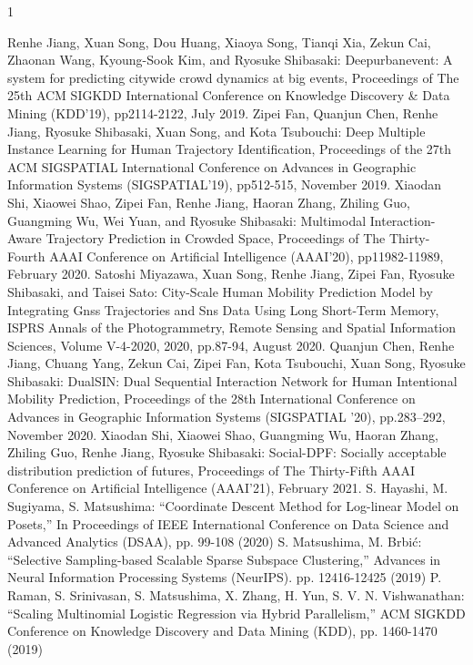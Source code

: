 \begin{査読付}{1}

Renhe Jiang, Xuan Song, Dou Huang, Xiaoya Song, Tianqi Xia, Zekun Cai, Zhaonan Wang, Kyoung-Sook Kim, and Ryosuke Shibasaki:
Deepurbanevent: A system for predicting citywide crowd dynamics at big events, Proceedings of The 25th ACM SIGKDD International Conference on Knowledge Discovery \& Data Mining (KDD'19), pp2114-2122, July 2019.
Zipei Fan, Quanjun Chen, Renhe Jiang, Ryosuke Shibasaki, Xuan Song, and Kota Tsubouchi:
Deep Multiple Instance Learning for Human Trajectory Identification, Proceedings of the 27th ACM SIGSPATIAL International Conference on Advances in Geographic Information Systems (SIGSPATIAL'19), pp512-515, November 2019.
Xiaodan Shi, Xiaowei Shao, Zipei Fan, Renhe Jiang, Haoran Zhang, Zhiling Guo, Guangming Wu, Wei Yuan, and Ryosuke Shibasaki:
Multimodal Interaction-Aware Trajectory Prediction in Crowded Space, Proceedings of The Thirty-Fourth AAAI Conference on Artificial Intelligence (AAAI'20), pp11982-11989, February 2020.
Satoshi Miyazawa, Xuan Song, Renhe Jiang, Zipei Fan, Ryosuke Shibasaki, and Taisei Sato:
City-Scale Human Mobility Prediction Model by Integrating Gnss Trajectories and Sns Data Using Long Short-Term Memory, ISPRS Annals of the Photogrammetry, Remote Sensing and Spatial Information Sciences, Volume V-4-2020, 2020, pp.87-94, August 2020.
Quanjun Chen, Renhe Jiang, Chuang Yang, Zekun Cai, Zipei Fan, Kota Tsubouchi, Xuan Song, Ryosuke Shibasaki: 
DualSIN: Dual Sequential Interaction Network for Human Intentional Mobility Prediction, Proceedings of the 28th International Conference on Advances in Geographic Information Systems (SIGSPATIAL '20), pp.283–292, November 2020.
Xiaodan Shi, Xiaowei Shao, Guangming Wu, Haoran Zhang, Zhiling Guo, Renhe Jiang, Ryosuke Shibasaki: 
Social-DPF: Socially acceptable distribution prediction of futures, Proceedings of The Thirty-Fifth AAAI Conference on Artificial Intelligence (AAAI'21), February 2021.
S. Hayashi, M. Sugiyama, S. Matsushima: “Coordinate Descent Method for Log-linear Model on Posets,”  In Proceedings of IEEE International Conference on Data Science and Advanced Analytics (DSAA), pp. 99-108 (2020)
S. Matsushima, M. Brbić: “Selective Sampling-based Scalable Sparse Subspace Clustering,” Advances in Neural Information Processing Systems (NeurIPS). pp. 12416-12425 (2019)
P. Raman, S. Srinivasan, S. Matsushima, X. Zhang, H. Yun, S. V. N. Vishwanathan: “Scaling Multinomial Logistic Regression via Hybrid Parallelism,” ACM SIGKDD Conference on Knowledge Discovery and Data Mining (KDD), pp. 1460-1470 (2019)

\end{査読付}

